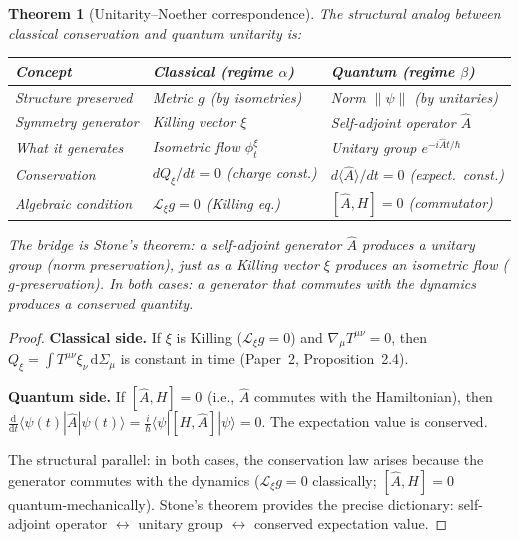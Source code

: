 \documentclass[12pt]{article}
\theoremstyle{plain}
\newtheorem{theorem}{Theorem}[section]
\theoremstyle{definition}
\theoremstyle{remark}
\newcommand{\dd}{\mathrm{d}}
\begin{document}
\begin{theorem}[Unitarity--Noether correspondence]\label{thm:correspondence}
The structural analog between classical conservation and quantum unitarity is:
\begin{center}\small
\begin{tabular}{lll}\toprule
\textbf{Concept} & \textbf{Classical (regime $\alpha$)} & \textbf{Quantum (regime $\beta$)} \\\midrule
Structure preserved & Metric $g$ (by isometries) & Norm $\|\psi\|$ (by unitaries) \\
Symmetry generator & Killing vector $\xi$ & Self-adjoint operator $\hat{A}$ \\
What it generates & Isometric flow $\phi_t^\xi$ & Unitary group $e^{-i\hat{A}t/\hbar}$ \\
Conservation & $dQ_\xi/dt = 0$ (charge const.) & $d\langle\hat{A}\rangle/dt = 0$ (expect.\ const.) \\
Algebraic condition & $\mathcal{L}_\xi g = 0$ (Killing eq.) & $[\hat{A}, H] = 0$ (commutator) \\
\bottomrule
\end{tabular}
\end{center}
The bridge is Stone's theorem: a self-adjoint generator $\hat{A}$ produces a unitary group (norm preservation), just as a Killing vector $\xi$ produces an isometric flow ($g$-preservation). In both cases: \emph{a generator that commutes with the dynamics produces a conserved quantity}.
\end{theorem}

\begin{proof}
\textbf{Classical side.} If $\xi$ is Killing ($\mathcal{L}_\xi g = 0$) and $\nabla_\mu T^{\mu\nu} = 0$, then $Q_\xi = \int T^{\mu\nu}\xi_\nu\,\dd\Sigma_\mu$ is constant in time (Paper~2, Proposition~2.4).

\textbf{Quantum side.} If $[\hat{A}, H] = 0$ (i.e., $\hat{A}$ commutes with the Hamiltonian), then $\frac{\dd}{\dd t}\langle\psi(t)|\hat{A}|\psi(t)\rangle = \frac{i}{\hbar}\langle\psi|[H, \hat{A}]|\psi\rangle = 0$. The expectation value is conserved.

The structural parallel: in both cases, the conservation law arises because the generator commutes with the dynamics ($\mathcal{L}_\xi g = 0$ classically; $[\hat{A}, H] = 0$ quantum-mechanically). Stone's theorem provides the precise dictionary: self-adjoint operator $\leftrightarrow$ unitary group $\leftrightarrow$ conserved expectation value.
\end{proof}
\end{document}
